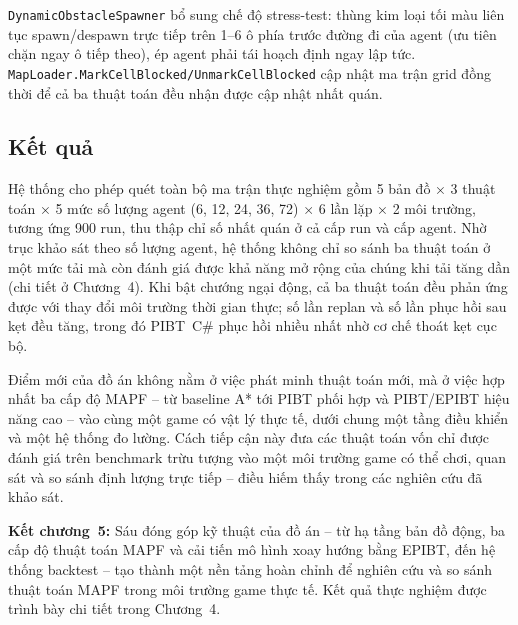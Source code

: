 \documentclass[../DoAn.tex]{subfiles}
\begin{document}
\texttt{Dynamic\allowbreak Obstacle\allowbreak Spawner} bổ sung chế độ stress-test: thùng kim loại tối màu
liên tục spawn/despawn trực tiếp trên 1--6 ô phía trước đường đi của agent (ưu tiên
chặn ngay ô tiếp theo), ép agent phải tái hoạch định ngay lập tức.
\texttt{MapLoader.\allowbreak MarkCellBlocked/\allowbreak UnmarkCellBlocked} cập nhật ma trận grid đồng thời
để cả ba thuật toán đều nhận được cập nhật nhất quán.

\subsection*{Kết quả}
Hệ thống cho phép quét toàn bộ ma trận thực nghiệm gồm 5 bản đồ × 3 thuật toán × 5 mức
số lượng agent (6, 12, 24, 36, 72) × 6 lần lặp × 2 môi trường, tương ứng 900 run, thu
thập chỉ số nhất quán ở cả cấp run và cấp agent. Nhờ trục khảo sát theo số lượng agent,
hệ thống không chỉ so sánh ba thuật toán ở một mức tải mà còn đánh giá được khả năng mở
rộng của chúng khi tải tăng dần (chi tiết ở Chương~4). Khi bật chướng ngại động, cả ba
thuật toán đều phản ứng được với thay đổi môi trường thời gian thực; số lần replan và số
lần phục hồi sau kẹt đều tăng, trong đó PIBT~C\# phục hồi nhiều nhất nhờ cơ chế thoát kẹt
cục bộ.

Điểm mới của đồ án không nằm ở việc phát minh thuật toán mới, mà ở việc hợp nhất ba cấp độ
MAPF -- từ baseline A* tới PIBT phối hợp và PIBT/EPIBT hiệu năng cao -- vào cùng một game có vật
lý thực tế, dưới chung một tầng điều khiển và một hệ thống đo lường. Cách tiếp cận này đưa các
thuật toán vốn chỉ được đánh giá trên benchmark trừu tượng vào một môi trường game có thể chơi,
quan sát và so sánh định lượng trực tiếp -- điều hiếm thấy trong các nghiên cứu đã khảo sát.

\textbf{Kết chương~5:} Sáu đóng góp kỹ thuật của đồ án -- từ hạ tầng bản đồ động, ba
cấp độ thuật toán MAPF và cải tiến mô hình xoay hướng bằng EPIBT, đến hệ thống backtest
-- tạo thành một nền tảng hoàn chỉnh để nghiên cứu và so sánh thuật toán MAPF trong môi
trường game thực tế. Kết quả thực nghiệm được trình bày chi tiết trong Chương~4.
\end{document}
